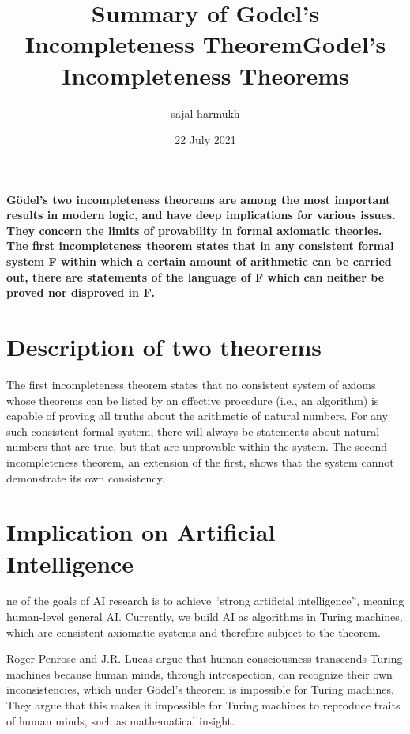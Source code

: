 \documentclass{article}
\title{Summary of Godel's Incompleteness Theorem}
\author{sajal harmukh}
\date{ 22 July 2021}
\begin{document}
\maketitle
\title{Godel's Incompleteness Theorems}
\paragraph{Gödel’s two incompleteness theorems are among the most important results in modern logic, and have deep implications for various issues. They concern the limits of provability in formal axiomatic theories. The first incompleteness theorem states that in any consistent formal system F within which a certain amount of arithmetic can be carried out, there are statements of the language of F which can neither be proved nor disproved in F.}
\section{Description of two theorems}
The first incompleteness theorem states that no consistent system of axioms whose theorems can be listed by an effective procedure (i.e., an algorithm) is capable of proving all truths about the arithmetic of natural numbers. For any such consistent formal system, there will always be statements about natural numbers that are true, but that are unprovable within the system. The second incompleteness theorem, an extension of the first, shows that the system cannot demonstrate its own consistency. 

\section{Implication on Artificial Intelligence}
ne of the goals of AI research is to achieve “strong artificial intelligence”, meaning human-level general AI. Currently, we build AI as algorithms in Turing machines, which are consistent axiomatic systems and therefore subject to the theorem.

Roger Penrose and J.R. Lucas argue that human consciousness transcends Turing machines because human minds, through introspection, can recognize their own inconsistencies, which under Gödel’s theorem is impossible for Turing machines. They argue that this makes it impossible for Turing machines to reproduce traits of human minds, such as mathematical insight.
\end{document}
